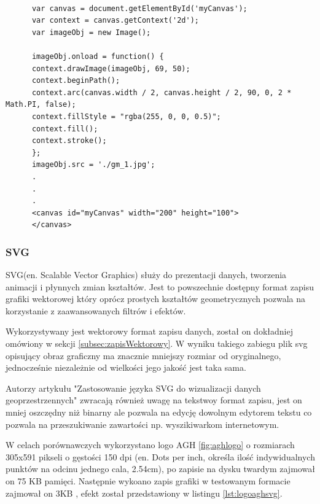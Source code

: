 \lstset{language=JavaScript}
\begin{lstlisting}[label={lst:canvas},caption={json}]

      var canvas = document.getElementById('myCanvas');
      var context = canvas.getContext('2d');
      var imageObj = new Image();
	
      imageObj.onload = function() {
      context.drawImage(imageObj, 69, 50);
	  context.beginPath();
      context.arc(canvas.width / 2, canvas.height / 2, 90, 0, 2 * Math.PI, false);
      context.fillStyle = "rgba(255, 0, 0, 0.5)";
      context.fill();
      context.stroke();
      };
      imageObj.src = './gm_1.jpg';
      .
      .
      .
      <canvas id="myCanvas" width="200" height="100">
      </canvas>
\end{lstlisting}

\subsubsection{SVG}
\label{subsubsec:svg}

SVG(en. Scalable Vector Graphics) służy do prezentacji danych, tworzenia animacji i płynnych zmian kształtów. Jest to powszechnie dostępny format zapisu grafiki wektorowej który oprócz prostych kształtów geometrycznych pozwala na korzystanie z zaawansowanych filtrów i efektów.

Wykorzystywany jest wektorowy format zapisu danych, został on dokładniej omówiony w sekcji \ref{subsec:zapisWektorowy}.
W wyniku takiego zabiegu plik svg opisujący obraz graficzny ma znacznie mniejszy rozmiar od oryginalnego, jednocześnie niezależnie od wielkości jego jakość jest taka sama.

Autorzy artykułu "Zastosowanie języka SVG do wizualizacji danych geoprzestrzennych" \cite{svgUse} zwracają również uwagę na tekstwoy format zapisu, jest on mniej oszczędny niż binarny ale pozwala na edycję dowolnym edytorem tekstu co pozwala na przeszukiwanie zawartości np. wyszikiwarkom internetowym.

W celach porównawczych wykorzystano logo AGH \ref{fig:aghlogo} o rozmiarach 305x591 pikseli o gęstości 150 dpi (en. Dots per inch, określa ilość indywidualnych punktów na odcinu jednego cala, 2.54cm), po zapisie na dysku twardym zajmował on 75 KB pamięci. Następnie wykoano zapis grafiki w testowanym formacie zajmował on 3KB , efekt został przedstawiony w listingu \ref{lst:logoaghsvg}.



